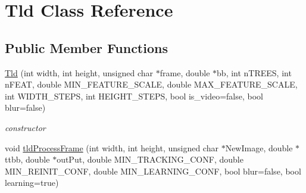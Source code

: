 \hypertarget{class_tld}{\section{\-Tld \-Class \-Reference}
\label{class_tld}
}
\subsection*{\-Public \-Member \-Functions}
\begin{DoxyCompactItemize}
\item 
\hyperlink{class_tld_a786c1358f158721603171efa55bbed1d}{\-Tld} (int width, int height, unsigned char $\ast$frame, double $\ast$bb, int n\-T\-R\-E\-E\-S, int n\-F\-E\-A\-T, double \-M\-I\-N\-\_\-\-F\-E\-A\-T\-U\-R\-E\-\_\-\-S\-C\-A\-L\-E, double \-M\-A\-X\-\_\-\-F\-E\-A\-T\-U\-R\-E\-\_\-\-S\-C\-A\-L\-E, int \-W\-I\-D\-T\-H\-\_\-\-S\-T\-E\-P\-S, int \-H\-E\-I\-G\-H\-T\-\_\-\-S\-T\-E\-P\-S, bool is\-\_\-video=false, bool blur=false)
\begin{DoxyCompactList}\small\item\em constructor \end{DoxyCompactList}\item 
void \hyperlink{class_tld_a5602f2c4be63e6659a7c7b626b9e851e}{tld\-Process\-Frame} (int width, int height, unsigned char $\ast$\-New\-Image, double $\ast$ttbb, double $\ast$out\-Put, double \-M\-I\-N\-\_\-\-T\-R\-A\-C\-K\-I\-N\-G\-\_\-\-C\-O\-N\-F, double \-M\-I\-N\-\_\-\-R\-E\-I\-N\-I\-T\-\_\-\-C\-O\-N\-F, double \-M\-I\-N\-\_\-\-L\-E\-A\-R\-N\-I\-N\-G\-\_\-\-C\-O\-N\-F, bool blur=false, bool learning=true)
\end{DoxyCompactItemize}


